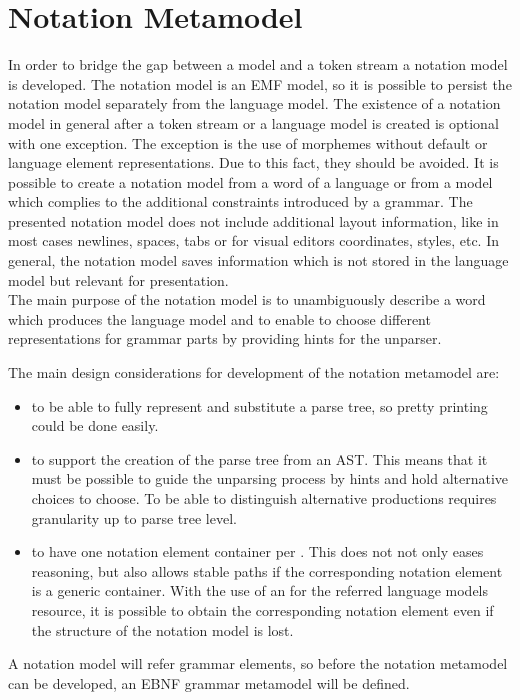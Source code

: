 \chapter{Notation Metamodel} \label{chp:NotMM}
In order to bridge the gap between a model and a token stream a notation model is developed. The notation model is an EMF model, so it is possible to persist the notation model separately from the language model. The existence of a notation model in general after a token stream or a language model is created is optional with one exception. The exception is the use of morphemes without default or language element representations. Due to this fact, they should be avoided. It is possible to create a notation model from a word of a language or from a model which complies to the additional constraints introduced by a grammar. The presented notation model does not include additional layout information, like in most cases newlines, spaces, tabs or for visual editors coordinates, styles, etc. In general, the notation model saves information which is not stored in the language model but relevant for presentation.\\

The main purpose of the notation model is to unambiguously describe a word which produces the language model and to enable to choose different representations for grammar parts by providing hints for the unparser.

The main design considerations for development of the notation metamodel are:
\begin{itemize}
	\item to be able to fully represent and substitute a parse tree, so pretty printing could be done easily.
	\item to support the creation of the parse tree from an AST. This means that it must be possible to guide the unparsing process by hints and hold alternative choices to choose. To be able to distinguish alternative productions requires granularity up to parse tree level.
	\item to have one notation element container per . This does not not only eases reasoning, but also allows stable paths if the corresponding notation element is a generic container. With the use of an  for the referred language models resource, it is possible to obtain the corresponding notation element even if the structure of the notation model is lost. 
\end{itemize}

A notation model will refer grammar elements, so before the notation metamodel can be developed, an EBNF grammar metamodel will be defined. \\

